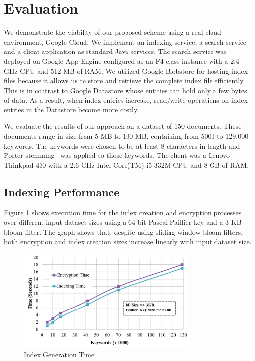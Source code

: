 \section{Evaluation}
\label{sec:eval}

We demonstrate the viability of our proposed scheme using a real cloud environment, Google Cloud.
We implement an indexing service, a search service and a
client application as standard Java services. The search service was deployed
on Google App Engine configured as an F4 class instance with a 2.4 GHz CPU and 512
MB of RAM. We utilized Google Blobstore for hosting index files because
it allows us to store and retrieve the complete index file efficiently.
This is in contrast to Google Datastore whose
entities can hold only a few bytes of data. As a result, when index entries increase,
read/write operations on index entries in the Datastore become more costly.

We evaluate the results of our approach on a dataset of 150 documents. 
These documents range in size from 5 MB to 100 MB, containing from 5000 to
129,000 keywords. The keywords were chosen to be at least 8 characters in
length and Porter stemming~\cite{porter} was applied to those keywords.
The client was a Lenovo Thinkpad 430 with a 2.6 GHz Intel Core(TM) i5-332M
CPU and 8 GB of RAM.

\subsection{Indexing Performance}
Figure \ref{fig:Index-Generation-Time} shows execution time for the index creation
and encryption 
processes over different input dataset sizes 
using a 64-bit Pascal Paillier key and a 3 KB bloom filter. The graph shows that,
despite using sliding window bloom filters, 
both encryption and index creation sizes increase linearly with input dataset size.

\begin{figure}[h!]
  \centering
  \includegraphics[width=3.5in]{figures/indexing_encryption_time.png}
  \caption{Index Generation Time}
  \label{fig:Index-Generation-Time}
\end{figure}

